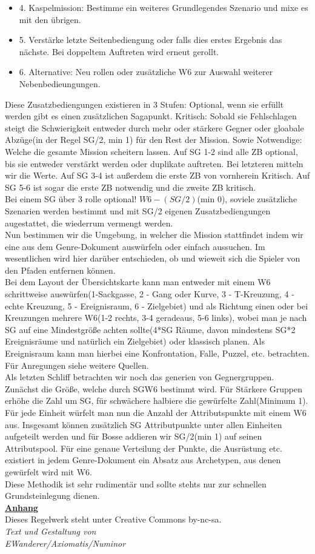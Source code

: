 \documentclass[twoside,a4paper]{minimal}
\begin{document}
\begin{multicols*}{3}
\begin{itemize}
\item 4. Kaspelmission: Bestimme ein weiteres Grundlegendes Szenario und mixe es mit den übrigen.
\item 5. Verstärke letzte Seitenbediengung oder falls dies erstes Ergebnis das nächste. Bei doppeltem Auftreten wird erneut gerollt.
\item 6. Alternative: Neu rollen oder zusätzliche W6 zur Auswahl weiterer Nebenbedieungungen.
\end{itemize} 
Diese Zusatzbediengungen existieren in 3 Stufen: Optional, wenn sie erfüllt werden gibt es einen zusätzlichen Sagapunkt. Kritisch: Sobald sie Fehlschlagen steigt die Schwierigkeit entweder durch mehr oder stärkere Gegner oder gloabale Abzüge(in der Regel SG/2, min 1) für den Rest der Mission. Sowie Notwendige: Welche die gesamte Mission scheitern lassen. Auf SG 1-2 sind alle ZB optional, bis sie entweder verstärkt werden oder duplikate auftreten. Bei letzteren mitteln wir die Werte. Auf SG 3-4 ist außerdem die erste ZB von vornherein Kritisch. Auf SG 5-6 ist sogar die erste ZB notwendig und die zweite ZB kritisch.
\\Bei einem SG über 3 rolle optional! $W6-(SG/2)$(min 0), soviele zusätzliche Szenarien werden bestimmt und mit SG/2 eigenen Zusatzbediengungen augestattet, die wiederrum vermengt werden.
\\Nun bestimmen wir die Umgebung, in welcher die Mission stattfindet indem wir eine aus dem Genre-Dokument auswürfeln oder einfach aussuchen. Im wesentlichen wird hier darüber entschieden, ob und wieweit sich die Spieler von den Pfaden entfernen können.
\\Bei dem Layout der Übersichtskarte kann man entweder mit einem W6 schrittweise auswürfen(1-Sackgasse, 2 - Gang oder Kurve, 3 - T-Kreuzung, 4 - echte Kreuzung, 5 - Ereignisraum, 6 - Zielgebiet) und als Richtung einen oder bei Kreuzungen mehrere W6(1-2 rechts, 3-4 geradeaus, 5-6 links), wobei man je nach SG auf eine Mindestgröße achten sollte(4*SG Räume, davon mindestens SG*2 Ereignisräume und natürlich ein Zielgebiet) oder klassisch planen. Als Ereignisraum kann man hierbei eine Konfrontation, Falle, Puzzel, etc. betrachten. Für Anregungen siehe weitere Quellen.
\\Als letzten Schliff betrachten wir noch das generien von Gegnergruppen. Zunächst die Größe, welche durch SGW6 bestimmt wird. Für Stärkere Gruppen erhöhe die Zahl um SG, für schwächere halbiere die gewürfelte Zahl(Minimum 1). Für jede Einheit würfelt man nun die Anzahl der Attributspunkte mit einem W6 aus. Insgesamt können zusätzlich SG Attributpunkte unter allen Einheiten aufgeteilt werden und für Bosse addieren wir SG/2(min 1) auf seinen Attributspool. Für eine genaue Verteilung der Punkte, die Ausrüstung etc. existiert in jedem Genre-Dokument ein Absatz aus Archetypen, aus denen gewürfelt wird mit W6.
\\Diese Methodik ist sehr rudimentär und sollte stehts nur zur schnellen Grundsteinlegung dienen.
\textbf{\uline{\\Anhang}}
\\Dieses Regelwerk steht unter Creative Commons by-nc-sa.
\textit{\\Text und Gestaltung von\\EWanderer/Axiomatis/Numinor}
\end{multicols*}
\end{document}
